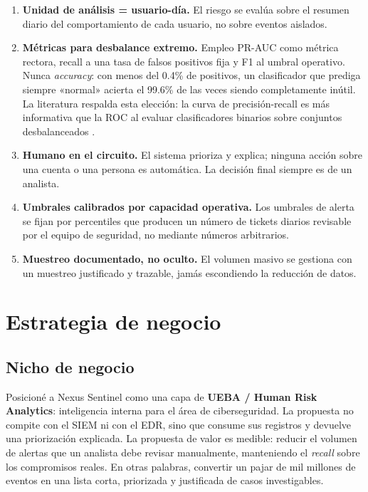 \documentclass[12pt, a4paper]{article}
\begin{document}
\begin{enumerate}[leftmargin=1.5cm]
  \item \textbf{Unidad de análisis = usuario-día.} El riesgo se evalúa sobre el resumen diario del
        comportamiento de cada usuario, no sobre eventos aislados.
  \item \textbf{Métricas para desbalance extremo.} Empleo PR-AUC como métrica rectora, recall a una
        tasa de falsos positivos fija y F1 al umbral operativo. Nunca \textit{accuracy}: con menos
        del 0.4\% de positivos, un clasificador que prediga siempre «normal» acierta el 99.6\% de las
        veces siendo completamente inútil. La literatura respalda esta elección: la curva de
        precisión-recall es más informativa que la ROC al evaluar clasificadores binarios sobre
        conjuntos desbalanceados \cite{saito2015}.
  \item \textbf{Humano en el circuito.} El sistema prioriza y explica; ninguna acción sobre una
        cuenta o una persona es automática. La decisión final siempre es de un analista.
  \item \textbf{Umbrales calibrados por capacidad operativa.} Los umbrales de alerta se fijan por
        percentiles que producen un número de tickets diarios revisable por el equipo de seguridad,
        no mediante números arbitrarios.
  \item \textbf{Muestreo documentado, no oculto.} El volumen masivo se gestiona con un muestreo
        justificado y trazable, jamás escondiendo la reducción de datos.
\end{enumerate}

\section{Estrategia de negocio}

\subsection{Nicho de negocio}

Posicioné a Nexus Sentinel como una capa de \textbf{UEBA / Human Risk Analytics}: inteligencia
interna para el área de ciberseguridad. La propuesta no compite con el SIEM ni con el EDR, sino que
consume sus registros y devuelve una priorización explicada. La propuesta de valor es medible:
reducir el volumen de alertas que un analista debe revisar manualmente, manteniendo el
\textit{recall} sobre los compromisos reales. En otras palabras, convertir un pajar de mil millones
de eventos en una lista corta, priorizada y justificada de casos investigables.
\end{document}
